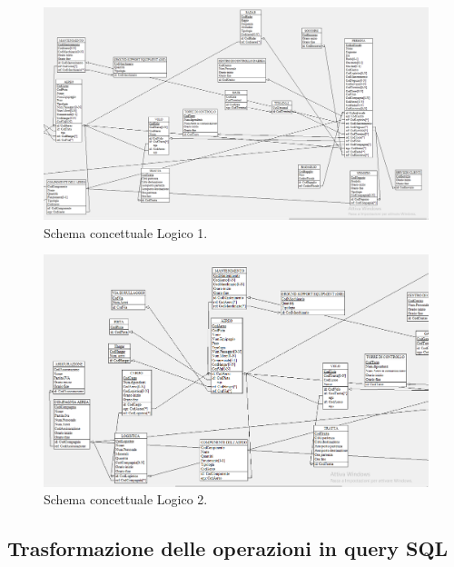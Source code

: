\begin{figure}[H] 
	\centering
	\includegraphics[width=1.2\linewidth, height=1.2\textheight, keepaspectratio]{./img/Schema_Logico/Schema_Logico1.png} 
	\caption{Schema concettuale Logico 1.}
	\label{fig:schema_logico1}
\end{figure}

\begin{figure}[H] 
	\centering
	\includegraphics[width=1.2\linewidth, height=1.2\textheight, keepaspectratio]{./img/Schema_Logico/Schema_Logico2.png}
	\caption{Schema concettuale Logico 2.}
	\label{fig:schema_logico2}
\end{figure}

\restoregeometry


\newpage

\subsection{Trasformazione delle operazioni in query SQL}

